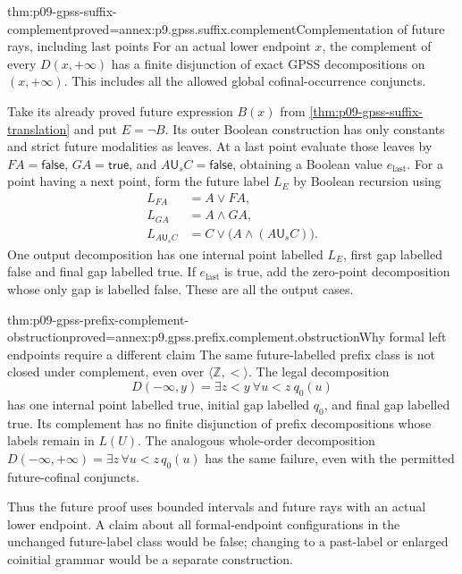 \begin{hbtheorem}{thm:p09-gpss-suffix-complement}{proved=annex:p9.gpss.suffix.complement}{Complementation of future rays, including last points}
For an actual lower endpoint \(x\), the complement of every
\(D(x,+\infty)\) has a finite disjunction of exact GPSS
decompositions on \((x,+\infty)\). This includes all the
allowed global cofinal-occurrence conjuncts.

Take its already proved future expression \(B(x)\) from
\cref{thm:p09-gpss-suffix-translation} and put \(E=\neg B\).
Its outer Boolean construction has only constants and strict
future modalities as leaves. At a last point evaluate those leaves
by \(F A=\mathsf{false}\), \(G A=\mathsf{true}\), and
\(A\mathbin{\mathsf U_s}C=\mathsf{false}\), obtaining a
Boolean value \(e_{\mathrm{last}}\). For a point having a next point,
form the future label \(L_E\) by Boolean recursion using
\[
\begin{aligned}
 L_{F A}&=A\lor F A,\\
 L_{G A}&=A\land G A,\\
 L_{A\mathbin{\mathsf U_s}C}
       &=C\lor\bigl(A\land(A\mathbin{\mathsf U_s}C)\bigr).
\end{aligned}
\]
One output decomposition has one internal point labelled \(L_E\),
first gap labelled false and final gap labelled true. If
\(e_{\mathrm{last}}\) is true, add the zero-point decomposition
whose only gap is labelled false. These are all the output cases.
\end{hbtheorem}

\begin{hbtheorem}{thm:p09-gpss-prefix-complement-obstruction}{proved=annex:p9.gpss.prefix.complement.obstruction}{Why formal left endpoints require a different claim}
The same future-labelled prefix class is not closed under
complement, even over \(\langle\mathbb Z,<\rangle\).
The legal decomposition
\[
 D(-\infty,y)=\exists z<y\ \forall u<z\ q_0(u)
\]
has one internal point labelled true, initial gap labelled \(q_0\),
and final gap labelled true. Its complement has no finite disjunction
of prefix decompositions whose labels remain in \(L(U)\).
The analogous whole-order decomposition
\(D(-\infty,+\infty)=\exists z\,\forall u<z\,q_0(u)\)
has the same failure, even with the permitted future-cofinal conjuncts.

Thus the future proof uses bounded intervals and future rays with an
actual lower endpoint. A claim about all formal-endpoint configurations
in the unchanged future-label class would be false; changing to a
past-label or enlarged coinitial grammar would be a separate construction.
\end{hbtheorem}

